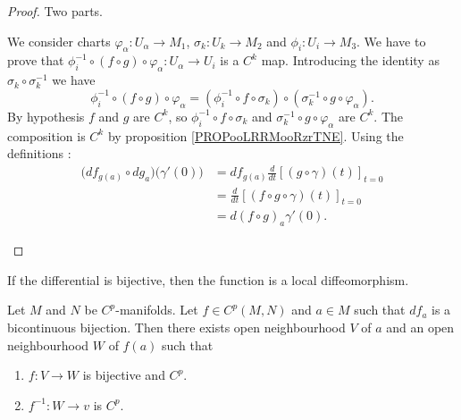 \begin{proof}
	Two parts.
	\begin{subproof}
		\spitem[\( f\circ g\) is \( C^k\)]
		We consider charts \(\varphi_{\alpha} \colon U_{\alpha}\to M_1  \), \(\sigma_k \colon U_k\to M_2  \) and \(\phi_i \colon U_i\to M_3  \). We have to prove that \(\phi_i^{-1}\circ(f\circ g)\circ\varphi_{\alpha} \colon U_{\alpha}\to U_i  \) is a \( C^k\) map. Introducing the identity as \( \sigma_k\circ\sigma_k^{-1}\) we have
		\begin{equation}
			\phi_i^{-1}\circ(f\circ g)\circ \varphi_{\alpha}=(\phi_i^{-1}\circ f\circ\sigma_k)\circ(\sigma_k^{-1}\circ g\circ\varphi_{\alpha}).
		\end{equation}
		By hypothesis \( f\) and \( g\) are \( C^k\), so \( \phi_i^{-1}\circ f\circ\sigma_k\)  and \( \sigma_k^{-1}\circ g\circ\varphi_{\alpha}\) are \( C^k\). The composition is \( C^k\) by proposition \ref{PROPooLRRMooRzrTNE}.
		Using the definitions :
		\begin{subequations}
			\begin{align}
				\big( df_{g(a)}\circ dg_a \big)\big( \gamma'(0) \big) & =df_{g(a)}\frac{d}{dt} \left[ (g\circ\gamma)(t)  \right]_{t=0} \\
				                                                      & =\frac{d}{dt} \left[ (f\circ g\circ\gamma)(t)  \right]_{t=0}   \\
				                                                      & =d(f\circ g)_a\gamma'(0).
			\end{align}
		\end{subequations}

	\end{subproof}
\end{proof}


If the differential is bijective, then the function is a local diffeomorphism.
\begin{theorem}	\label{THOooDWEXooMClWVi}
	Let \( M\) and \( N\) be \( C^p\)-manifolds. Let \( f\in C^p(M,N)\) and \( a\in M\) such that \( df_a\) is a bicontinuous bijection. Then there exists open neighbourhood \( V\) of \( a\) and an open neighbourhood \( W\) of \( f(a)\) such that
	\begin{enumerate}
		\item
		      \(f \colon V\to W  \) is bijective and \( C^p\).
		\item
		      \(f^{-1} \colon W\to v  \) is \( C^p\).
	\end{enumerate}
\end{theorem}


